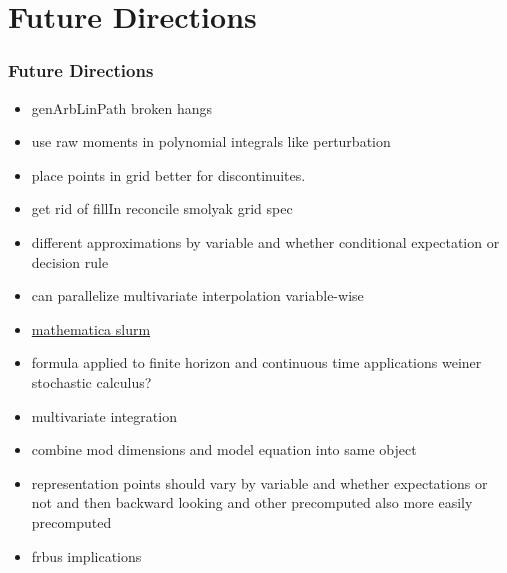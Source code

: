 \documentclass[tikz]{beamer}
\begin{document}
\section{Future Directions}
\begin{frame}
\frametitle{Future Directions}
\begin{itemize}
\item genArbLinPath broken hangs 
\item use raw moments in polynomial integrals like perturbation
\item place points in grid better for discontinuites.
\item get rid of fillIn  reconcile smolyak grid spec
\item different approximations by variable and whether conditional expectation or decision rule
\item can parallelize multivariate interpolation variable-wise
\item \href{https://rcc.uchicago.edu/docs/software/environments/mathematica/index.html}{mathematica slurm}
  \item formula applied to finite horizon and continuous time applications weiner stochastic calculus?
  \item multivariate integration
  \item combine mod dimensions and model equation into same object
  \item representation points should vary by variable and whether expectations or not and then backward looking and other precomputed also more easily precomputed
  \item frbus implications
\end{itemize}
\end{frame}
\end{document}
